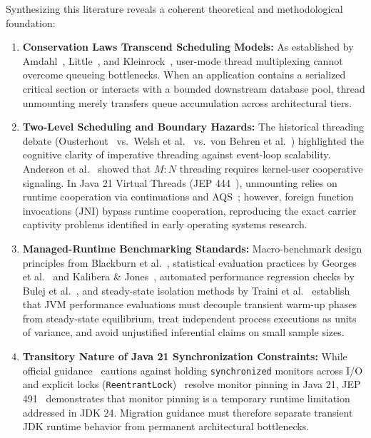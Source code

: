 Synthesizing this literature reveals a coherent theoretical and methodological foundation:
\begin{enumerate}
  \item \textbf{Conservation Laws Transcend Scheduling Models:} As established by Amdahl~\cite{Amdahl1967}, Little~\cite{Little1961,Little2011}, and Kleinrock~\cite{Kleinrock1975}, user-mode thread multiplexing cannot overcome queueing bottlenecks. When an application contains a serialized critical section or interacts with a bounded downstream database pool, thread unmounting merely transfers queue accumulation across architectural tiers.
  \item \textbf{Two-Level Scheduling and Boundary Hazards:} The historical threading debate (Ousterhout~\cite{Ousterhout1996} vs.\ Welsh et al.~\cite{Welsh2001} vs.\ von Behren et al.~\cite{VonBehren2003}) highlighted the cognitive clarity of imperative threading against event-loop scalability. Anderson et al.~\cite{Anderson1991} showed that $M:N$ threading requires kernel-user cooperative signaling. In Java 21 Virtual Threads (JEP 444~\cite{JEP444}), unmounting relies on runtime cooperation via continuations and AQS~\cite{Lea2000FJ}; however, foreign function invocations (JNI) bypass runtime cooperation, reproducing the exact carrier captivity problems identified in early operating systems research.
  \item \textbf{Managed-Runtime Benchmarking Standards:} Macro-benchmark design principles from Blackburn et al.~\cite{Blackburn2006}, statistical evaluation practices by Georges et al.~\cite{Georges2007} and Kalibera \& Jones~\cite{Kalibera2013}, automated performance regression checks by Bulej et al.~\cite{Bulej2017}, and steady-state isolation methods by Traini et al.~\cite{Traini2022} establish that JVM performance evaluations must decouple transient warm-up phases from steady-state equilibrium, treat independent process executions as units of variance, and avoid unjustified inferential claims on small sample sizes.
  \item \textbf{Transitory Nature of Java 21 Synchronization Constraints:} While official guidance~\cite{OracleVTGuidance} cautions against holding \texttt{synchronized} monitors across I/O and explicit locks (\texttt{ReentrantLock})~\cite{Goetz2006,Herlihy2008} resolve monitor pinning in Java 21, JEP 491~\cite{JEP491} demonstrates that monitor pinning is a temporary runtime limitation addressed in JDK 24. Migration guidance must therefore separate transient JDK runtime behavior from permanent architectural bottlenecks.
\end{enumerate}

